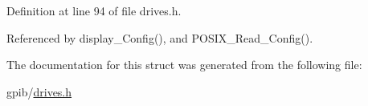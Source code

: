 Definition at line 94 of file drives.\+h.



Referenced by display\+\_\+\+Config(), and P\+O\+S\+I\+X\+\_\+\+Read\+\_\+\+Config().



The documentation for this struct was generated from the following file\+:\begin{DoxyCompactItemize}
\item 
gpib/\hyperlink{drives_8h}{drives.\+h}\end{DoxyCompactItemize}
